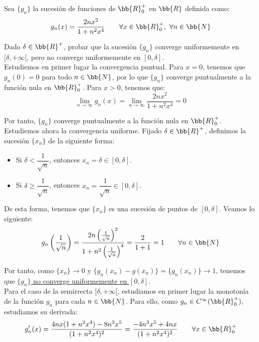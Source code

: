 \begin{ejercicio}
    Sea $\{g_n\}$ la sucesión de funciones de $\bb{R}^+_0$ en $\bb{R}$ definida como:
    \begin{equation*}
        g_n(x) = \frac{2nx^2}{1+n^2x^4} \qquad \forall x\in \bb{R}^+_0,~\forall n\in \bb{N}
    \end{equation*}

    Dado $\delta\in \bb{R}^+$, probar que la sucesión $\{g_n\}$ converge uniformemente en $[\delta,+\infty[$, pero no
    converge uniformemente en $[0,\delta]$.\\


    Estudiemos en primer lugar la convergencia puntual. Para $x=0$, tenemos que $g_n(0)=0$ para todo $n\in \bb{N}$, por lo que $\{g_n\}$ converge puntualmente a la función nula en $\bb{R}^+_0$. Para $x>0$, tenemos que:
    \begin{equation*}
        \lim_{n\to \infty} g_n(x) = \lim_{n\to \infty} \frac{2nx^2}{1+n^2x^4} = 0
    \end{equation*}

    Por tanto, $\{g_n\}$ converge puntualmente a la función nula en $\bb{R}^+_0$.\\

    Estudiemos ahora la convergencia uniforme. Fijado $\delta\in \bb{R}^+$, definimos la sucesión $\{x_n\}$ de la siguiente forma:
    \begin{itemize}
        \item Si $\delta < \dfrac{1}{\sqrt{n}}$, entonces $x_n = \delta \in [0,\delta]$.
        \item Si $\delta \geq \dfrac{1}{\sqrt{n}}$, entonces $x_n = \dfrac{1}{\sqrt{n}}\in [0,\delta]$.
    \end{itemize}

    De esta forma, tenemos que $\{x_n\}$ es una sucesión de puntos de $[0,\delta]$. Veamos lo siguiente:
    \begin{equation*}
        g_n\left(\frac{1}{\sqrt{n}}\right) = \frac{2n\left(\frac{1}{\sqrt{n}}\right)^2}{1+n^2\left(\frac{1}{\sqrt{n}}\right)^4} =
        \frac{2}{1+1}=1 \qquad \forall n\in \bb{N}
    \end{equation*}

    Por tanto, como $\{x_n\}\to 0$ y $\{g_n(x_n)-g(x_n)\}=\{g_n(x_n)\}\to 1$, tenemos que \ul{$\{g_n\}$ no converge uniformemente en $[0,\delta]$}.\\

    Para el caso de la semirrecta $[\delta,+\infty[$, estudiamos en primer lugar la monotonía de la función $g_n$ para cada $n\in \bb{N}$. Para ello, como $g_n\in C^\infty(\bb{R}^+_0)$, estudiamos
    su derivada:
    \begin{equation*}
        g_n'(x) = \frac{4nx(1+n^2x^4)-8n^3x^5}{(1+n^2x^4)^2} = \frac{-4n^3x^5+4nx}{(1+n^2x^4)^2} \qquad \forall x\in \bb{R}^+_0
    \end{equation*}


\end{ejercicio}
